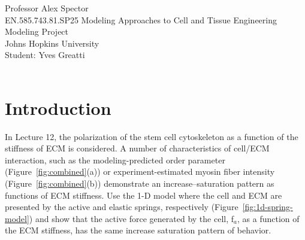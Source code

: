 \documentclass[a4paper,margin=1in]{article}
\begin{document}
\noindent Professor Alex Spector\\
EN.585.743.81.SP25 Modeling Approaches to Cell and Tissue Engineering\\
Modeling Project\\
Johns Hopkins University\\
Student: Yves Greatti\\\

\section*{Introduction}
In Lecture 12, the polarization of the stem cell cytoskeleton as a function of
the stiffness of ECM is considered. A number of characteristics of cell/ECM
interaction, such as the modeling-predicted order parameter \cite{Zemel2010}
(Figure~\ref{fig:combined}(a)) or experiment-estimated myosin fiber intensity
\cite{Zemel2010} (Figure~\ref{fig:combined}(b)) demonstrate an
increase–saturation pattern as functions of ECM stiffness.
Use the 1-D model where the cell and ECM are presented by the active and
elastic springs, respectively \cite{Zemel2010}  (Figure~\ref{fig:1d-spring-model}) and show that the active force generated
by the cell, f$_a$, as a function of the ECM stiffness, has the same increase 
saturation pattern of behavior.
\end{document}
